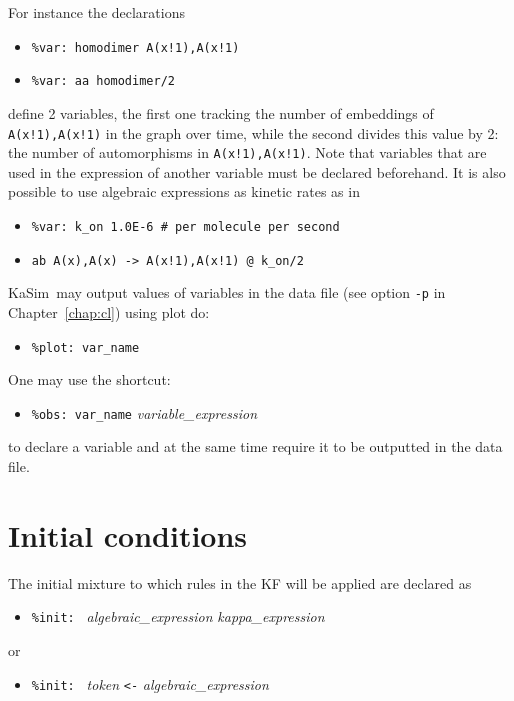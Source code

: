 \documentclass[11pt]{book}
\def\KaSim{\textsf{KaSim}}
\def\ttt#1{\texttt{#1}}
\def\var#1{\textquotesingle #1\textquotesingle}
\def\noi{\noindent}
\def\ITE#1{\begin{itemize}#1\end{itemize}}
\begin{document}

\noi For instance the declarations
\ITE{
\item[] \ttt{\%var: \var{homodimer}~A(x!1),A(x!1)}
\item[] \ttt{\%var: \var{aa}~\var{homodimer}/2}
}
define 2 variables, the first one tracking the number of embeddings of \ttt{A(x!1),A(x!1)} in the graph over time, while the second divides this value by 2: the number of automorphisms in \ttt{A(x!1),A(x!1)}. Note that variables that are used in the expression of another variable must be declared beforehand. 
\vskip 0.25cm
\noi It is also possible to use algebraic expressions as kinetic rates as in
\ITE{
\item[] \ttt{\%var: \var{k\_on}~1.0E-6 \# per molecule per second}
\item[] \ttt{\var{ab}~A(x),A(x) -> A(x!1),A(x!1) @ \var{k\_on}/2}
}
\KaSim~may output values of variables in the data file (see option \ttt{-p} in Chapter~\ref{chap:cl}) using plot do:
\ITE{
\item[] \ttt{\%plot: \textquotesingle var\_name\textquotesingle }
}
One may use the shortcut: 
\ITE{
\item[] \ttt{\%obs: \textquotesingle var\_name\textquotesingle  } \textit{variable\_expression}
}
to declare a variable and at the same time require it to be outputted in the data file. 

\section{Initial conditions}\label{sec:init}

The initial mixture to which rules in the KF will be applied are declared as
\ITE{
\item[] \ttt{\%init: } \textit{algebraic\_expression} \textit{kappa\_expression}
}
or
\ITE{
\item[] \ttt{\%init: }  \textit{token} \ttt{<-} \textit{algebraic\_expression}
}
\end{document}
